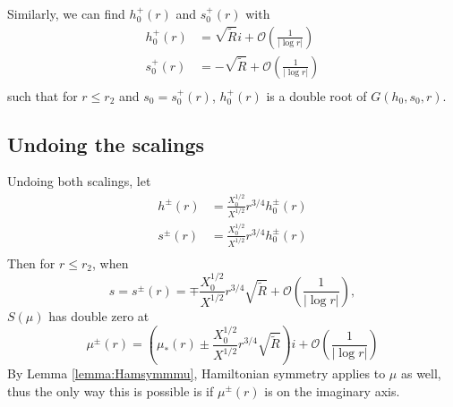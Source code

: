 \documentclass[thesis.tex]{subfiles}
\begin{document}
Similarly, we can find $h_0^+(r)$ and $s_0^+(r)$ with
\begin{align*}
h_0^+(r) &= \sqrt{\tilde{R}}i + \mathcal{O}\left( \frac{1}{|\log r|} \right) \\
s_0^+(r) &= -\sqrt{\tilde{R}} + \mathcal{O}\left( \frac{1}{|\log r|} \right) \\
\end{align*}
such that for $r \leq r_2$ and $s_0 = s_0^+(r)$, $h_0^+(r)$ is a double root of $G(h_0, s_0, r)$.

\subsection{Undoing the scalings}

Undoing both scalings, let 
\begin{align*}
h^\pm(r) &= \frac{X_0^{1/2}}{X^{1/2}}r^{3/4} h_0^\pm(r) \\
s^\pm(r) &= \frac{X_0^{1/2}}{X^{1/2}}r^{3/4} h_0^\pm(r) \\
\end{align*}
Then for $r \leq r_2$, when 
\[
s = s^\pm(r) = \mp \frac{X_0^{1/2}}{X^{1/2}}r^{3/4} \sqrt{\tilde{R}} + \mathcal{O}\left( \frac{1}{|\log r|} \right),
\]
$S(\mu)$ has double zero at
\[
\mu^\pm(r) = \left( \mu_*(r) \pm \frac{X_0^{1/2}}{X^{1/2}}r^{3/4} \sqrt{\tilde{R}} \right)i + \mathcal{O}\left( \frac{1}{|\log r|} \right)
\]
By Lemma \ref{lemma:Hamsymmmu}, Hamiltonian symmetry applies to $\mu$ as well, thus the only way this is possible is if $\mu^\pm(r)$ is on the imaginary axis. 


\iffulldocument\else
	
	
\fi
\end{document}
